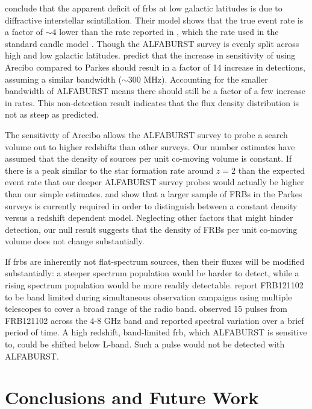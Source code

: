 \documentclass[a4paper,fleqn,usenatbib]{mnras}
\begin{document}
\cite{2015MNRAS.451.3278M} conclude that the apparent deficit of \glspl{frb} at
low galactic latitudes is due to diffractive interstellar scintillation. Their
model shows that the true event rate is a factor of $\sim 4$ lower than the rate
reported in \cite{2013Sci...341...53T}, which the rate used in the standard
candle model \citep{2013MNRAS.436L...5L}. Though the ALFABURST survey is evenly
split across high and low galactic latitudes.  \cite{2015MNRAS.451.3278M} predict
that the increase in sensitivity of using Arecibo compared to Parkes should
result in a factor of 14 increase in detections, assuming a similar bandwidth
($\sim 300$ MHz). Accounting for the smaller bandwidth of ALFABURST means there
should still be a factor of a few increase in rates. This non-detection result
indicates that the \cite{2015MNRAS.451.3278M} flux density distribution is not
as steep as predicted.

The sensitivity of Arecibo allows the ALFABURST survey to probe a search volume
out to higher redshifts than other surveys. Our number estimates have assumed
that the density of sources per unit co-moving volume is constant.  If there is
a peak similar to the star formation rate around $z=2$
\citep{2014ARA&A..52..415M} than the expected event rate that our deeper
ALFABURST survey probes would actually be higher than our simple estimates.
\citet{2016MNRAS.458..708C} and \citet{ranethesis} show that a larger sample of
FRBs in the Parkes surveys is currently required in order to distinguish
between a constant density versus a redshift dependent model. Neglecting other
factors that might hinder detection, our null result suggests that the density
of FRBs per unit co-moving volume does not change substantially.

If \glspl{frb} are inherently not flat-spectrum sources, then their fluxes will
be modified substantially: a steeper spectrum population would be harder to
detect, while a rising spectrum population would be more readily detectable.
\cite{2017arXiv170507553L} report FRB121102 to be band limited during
simultaneous observation campaigns using multiple telescopes to cover a broad
range of the radio band. \cite{atel10675} observed 15 pulses from FRB121102
across the 4-8 GHz band and reported spectral variation over a brief period of
time. A high redshift, band-limited \gls{frb}, which ALFABURST is sensitive to,
could be shifted below L-band. Such a pulse would not be detected with
ALFABURST.

\section{Conclusions and Future Work}
\label{sec:future_work}
\end{document}
